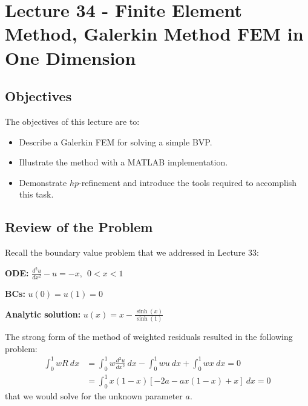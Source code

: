 \chapter{Lecture 34 - Finite Element Method, Galerkin Method FEM in One Dimension}
\label{ch:lec34n}
\section{Objectives}
The objectives of this lecture are to:
\begin{itemize}
\item Describe a Galerkin FEM for solving a simple BVP.
\item Illustrate the method with a MATLAB implementation.
\item Demonstrate $hp$-refinement and introduce the tools required to accomplish this task.
\end{itemize}
\setcounter{lstannotation}{0}

\section{Review of the Problem}

Recall the boundary value problem that we addressed in Lecture 33:
\vspace{0.25cm}

\noindent\textbf{ODE:} $ \frac{d^2 u}{dx^2} - u = -x, \ \ 0 < x < 1$

\vspace{0.25cm}

\noindent\textbf{BCs:} $ u(0) = u(1) = 0$

\vspace{0.25cm}

\noindent\textbf{Analytic solution:} $u(x) = x - \frac{\sinh{(x)}}{\sinh{(1)}}$

\vspace{0.25cm}

\noindent The strong form of the method of weighted residuals resulted in the following problem:
\begin{align*}
\int_{0}^{1} w R \ dx &= \int_{0}^{1} w\frac{d^2u}{dx^2} \  dx - \int_{0}^{1} w u \ dx + \int_{0}^{1} wx \ dx = 0 \\
&=\int_{0}^{1} x(1-x) \left[-2a - ax(1-x) + x\right] \ dx = 0
\end{align*}
that we would solve for the unknown parameter $a$.

\vspace{0.25cm}

